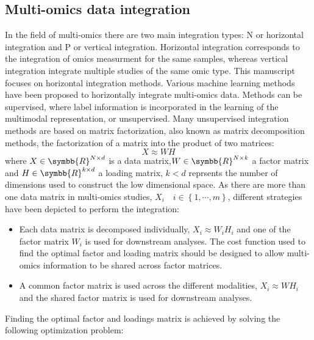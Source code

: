 \documentclass[../main.tex]{subfiles}
\begin{document}


	\subsection{Multi-omics data integration}
	  In the field of multi-omics there are two main integration types: N or horizontal integration and P or vertical integration.
	  Horizontal integration corresponds to the integration of omics measurment for the same samples, whereas vertical integration integrate multiple studies of the same omic type.
	  This manuscript focuses on horizontal integration methods.
	  Various machine learning methods have been proposed to horizontally integrate multi-omics data.
	  Methods can be supervised, where label information is incorporated in the learning of the multimodal representation, or unsupervised.
	  Many unsupervised integration methods are based on matrix factorization, also known as matrix decomposition methods, the factorization of a matrix into the product of two matrices:
	  \begin{equation}
	    X \approx WH
	  \end{equation}
	  where \(X \in \symbb{R}^{N\times d}\) is a data matrix,\(W \in \symbb{R}^{N\times k}\) a factor matrix and \(H \in \symbb{R}^{k\times d}\) a loading matrix, \(k < d\) reprsents the number of dimensions used to construct the low dimensional space.
	  As there are more than one data matrix in multi-omics studies, \(X_i\quad i \in \left\{1, \cdots, m\right\}\), different strategies have been depicted to perform the integration:
	  \begin{itemize}[nosep]
	    \item Each data matrix is decomposed individually, \(X_i \approx W_iH_i\) and one of the factor matrix \(W_i\) is used for downstream analyses. The cost function used to find the optimal factor and loading matrix should be designed to allow multi-omics information to be shared across factor matrices.
	    \item A common factor matrix is used across the different modalities, \(X_i \approx WH_i\) and the shared factor matrix is used for downstream analyses.
	  \end{itemize}
	  Finding the optimal factor and loadings matrix is achieved by solving the following optimization problem:
\end{document}
